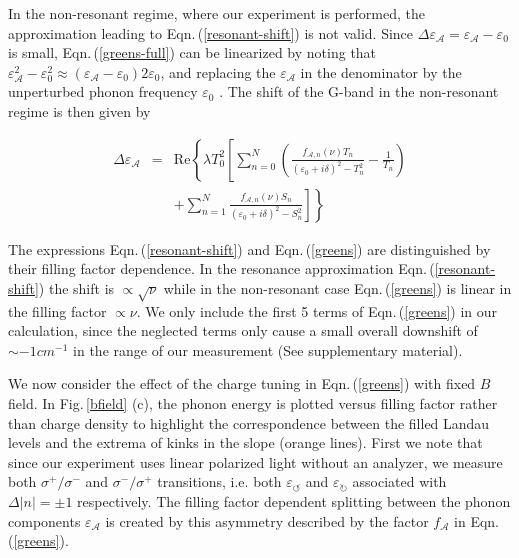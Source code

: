 \documentclass[prl,aps,superscriptaddress,showpacs,reprint]{revtex4-1}
\begin{document}
In the non-resonant regime, where our experiment is performed, the approximation leading to Eqn.\,(\ref{resonant-shift}) is not valid. Since  $\Delta\varepsilon_{\mathcal{A}} = \varepsilon_{\mathcal{A}} - \varepsilon_0$ is small, Eqn.\,(\ref{greens-full}) can be linearized by noting that $\varepsilon_{\mathcal{A}}^2-\varepsilon_0^2 \approx (\varepsilon_{\mathcal{A}}-\varepsilon_0)2\varepsilon_0$, and  replacing the $\varepsilon_{\mathcal{A}}$ in the denominator by the unperturbed phonon frequency $\varepsilon_0$ \cite{ando2007magnetic}. The shift of the G-band in the non-resonant regime is then given by

\begin{eqnarray}
\label{greens}
\Delta\varepsilon_{\mathcal{A}} &=& \mathrm{Re}\left\lbrace \lambda T_0^2 \left[ \sum_{n=0}^N\left(\frac{f_{\mathcal{A},n}\left(\nu\right) T_n}{\left(\varepsilon_{0}+i\delta\right)^2-T_n^2}-\frac{1}{T_n}\right)\right.\right.\nonumber \\
& &\left.\left. +\sum_{n=1}^{N}\frac{f_{\mathcal{A},n}\left(\nu\right) S_n}{\left(\varepsilon_{0}+i\delta\right)^2-S_n^2}\right]\right\rbrace
\end{eqnarray}

The expressions Eqn.\,(\ref{resonant-shift}) and Eqn.\,(\ref{greens}) are distinguished by their filling factor dependence. In the resonance approximation Eqn.\,(\ref{resonant-shift}) the shift is $\propto \sqrt{\nu}$ while in the non-resonant case Eqn.\,(\ref{greens}) is linear in the filling factor $\propto \nu$.
We only include the first 5 terms of Eqn.\,(\ref{greens}) in our calculation, since the neglected terms only cause a small overall downshift of $\sim -1cm^{-1}$ in the range of our measurement (See supplementary material).

We now consider the effect of the charge tuning in Eqn.\,(\ref{greens}) with fixed $B$ field.  In Fig.\,\ref{bfield} (c), the phonon energy is plotted versus filling factor rather than charge density to highlight the correspondence between the filled Landau levels and the extrema of kinks in the slope (orange lines). First we note that since our experiment uses linear polarized light without an analyzer, we measure both  $\sigma^+/\sigma^-$  and $\sigma^-/\sigma^+$ transitions, i.e. both $\varepsilon_{\circlearrowleft}$ and $\varepsilon_{\circlearrowright}$ associated with $\Delta |n|=\pm1$ respectively. The filling factor dependent splitting between the phonon components $\varepsilon_{\mathcal{A}}$ is created by this asymmetry described by the factor $f_{\mathcal{A}}$ in Eqn.\,(\ref{greens}).
\end{document}
